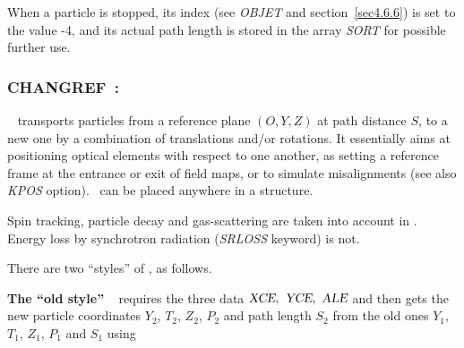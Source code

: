 \noindent When a particle is stopped, its index 
\IEX{}  (see \textsl{OBJET} and 
section~\ref{sec4.6.6}) is set to the value -4, and its actual path length is stored in the array 
\textsl{SORT} for possible further use. 




\newpage

\subsubsection*{CHANGREF~: \CHANGREFTitl} \label{CHANGREF}
\medskip 

\noindent \CHANGREF\        
transports  particles from a reference plane  $(O,Y,Z)$  at path distance $S$, to a new one by a combination of 
translations and/or rotations.  It essentially aims at positioning optical elements with respect 
to one another, 
as setting a reference frame at the entrance
or exit of field maps, or to simulate misalignments (see also  \textsl{KPOS} option).  
 \CHANGREF\      can be placed anywhere in a structure. 

\medskip

\noindent  Spin tracking, 
particle decay and gas-scattering are taken into account in  \CHANGREF. 
Energy loss by synchrotron radiation (\textsl{SRLOSS} keyword) is not. 

\medskip

\noindent There are two ``styles'' of \CHANGREF, as follows.

\bigskip

\noindent \textbf{ The ``old style'' \CHANGREF}~    \label{CHANGREFOld}  
requires the three data $\textsl{XCE}, ~ \textsl{YCE}, ~ \textsl{ALE}$ and then 
 gets the  new particle coordinates  $ Y_2$,  $ T_2$,  $ Z_2$, 
$ P_2 $  and path length $ S_2 $  from the old ones  $ Y_1$,   
$ T_1$,  $ Z_1$,  $ P_1 $ and $ S_1 $ using

